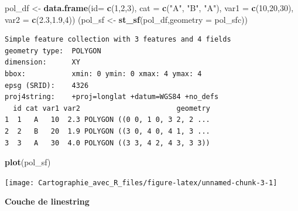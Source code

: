 \documentclass[]{book}
\newenvironment{Shaded}{\begin{snugshade}}{\end{snugshade}}
\newcommand{\KeywordTok}[1]{\textcolor[rgb]{0.13,0.29,0.53}{\textbf{#1}}}
\newcommand{\DataTypeTok}[1]{\textcolor[rgb]{0.13,0.29,0.53}{#1}}
\newcommand{\DecValTok}[1]{\textcolor[rgb]{0.00,0.00,0.81}{#1}}
\newcommand{\FloatTok}[1]{\textcolor[rgb]{0.00,0.00,0.81}{#1}}
\newcommand{\StringTok}[1]{\textcolor[rgb]{0.31,0.60,0.02}{#1}}
\newcommand{\NormalTok}[1]{#1}
\begin{document}
\begin{Shaded}
\begin{Highlighting}[]
\NormalTok{pol_df <-}\StringTok{ }\KeywordTok{data.frame}\NormalTok{(}\DataTypeTok{id=} \KeywordTok{c}\NormalTok{(}\DecValTok{1}\NormalTok{,}\DecValTok{2}\NormalTok{,}\DecValTok{3}\NormalTok{), }\DataTypeTok{cat =} \KeywordTok{c}\NormalTok{(}\StringTok{"A"}\NormalTok{, }\StringTok{"B"}\NormalTok{, }\StringTok{"A"}\NormalTok{), }
                     \DataTypeTok{var1 =} \KeywordTok{c}\NormalTok{(}\DecValTok{10}\NormalTok{,}\DecValTok{20}\NormalTok{,}\DecValTok{30}\NormalTok{), }\DataTypeTok{var2 =} \KeywordTok{c}\NormalTok{(}\FloatTok{2.3}\NormalTok{,}\FloatTok{1.9}\NormalTok{,}\DecValTok{4}\NormalTok{))}
\NormalTok{(pol_sf <-}\StringTok{ }\KeywordTok{st_sf}\NormalTok{(pol_df,}\DataTypeTok{geometry =}\NormalTok{ pol_sfc))}
\end{Highlighting}
\end{Shaded}

\begin{verbatim}
Simple feature collection with 3 features and 4 fields
geometry type:  POLYGON
dimension:      XY
bbox:           xmin: 0 ymin: 0 xmax: 4 ymax: 4
epsg (SRID):    4326
proj4string:    +proj=longlat +datum=WGS84 +no_defs
  id cat var1 var2                       geometry
1  1   A   10  2.3 POLYGON ((0 0, 1 0, 3 2, 2 ...
2  2   B   20  1.9 POLYGON ((3 0, 4 0, 4 1, 3 ...
3  3   A   30  4.0 POLYGON ((3 3, 4 2, 4 3, 3 3))
\end{verbatim}

\begin{Shaded}
\begin{Highlighting}[]
\KeywordTok{plot}\NormalTok{(pol_sf)}
\end{Highlighting}
\end{Shaded}

\begin{center}\texttt{[image: Cartographie\_avec\_R\_files/figure-latex/unnamed-chunk-3-1]} \end{center}

\textbf{Couche de linestring}
\end{document}

